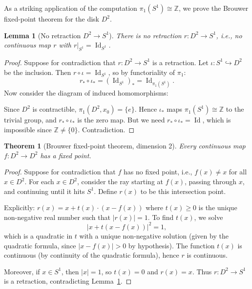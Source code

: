 \documentclass[12pt,a4paper,openany]{book}
\theoremstyle{definition}
\theoremstyle{plain}
\newtheorem{theorem}[definition]{Theorem}
\newtheorem{lemma}[definition]{Lemma}
\theoremstyle{remark}
\newcommand{\Z}{\mathbb{Z}}
\DeclareMathOperator{\Id}{Id}
\newcommand{\abs}[1]{\left|#1\right|}
\begin{document}
As a striking application of the computation $\pi_1(S^1) \cong \Z$, we prove
the Brouwer fixed-point theorem for the disk $D^2$.

\begin{lemma}[No retraction $D^2 \to S^1$]\label{lem:no-retraction}
There is no retraction $r \colon D^2 \to S^1$, i.e., no continuous map $r$
with $r|_{S^1} = \Id_{S^1}$.
\end{lemma}

\begin{proof}
Suppose for contradiction that $r \colon D^2 \to S^1$ is a retraction. Let
$\iota \colon S^1 \hookrightarrow D^2$ be the inclusion. Then $r \circ \iota =
\Id_{S^1}$, so by functoriality of $\pi_1$:
\[
  r_* \circ \iota_* = (\Id_{S^1})_* = \Id_{\pi_1(S^1)}.
\]
Now consider the diagram of induced homomorphisms:
\begin{center}
\end{center}
Since $D^2$ is contractible, $\pi_1(D^2, x_0) = \{e\}$. Hence $\iota_*$ maps
$\pi_1(S^1) \cong \Z$ to the trivial group, and $r_* \circ \iota_*$ is the
zero map. But we need $r_* \circ \iota_* = \Id$, which is impossible since
$\Z \ne \{0\}$. Contradiction.
\end{proof}

\begin{theorem}[Brouwer fixed-point theorem, dimension 2]\label{thm:brouwer-2d}
Every continuous map $f \colon D^2 \to D^2$ has a fixed point.
\end{theorem}

\begin{proof}
Suppose for contradiction that $f$ has no fixed point, i.e., $f(x) \ne x$ for
all $x \in D^2$. For each $x \in D^2$, consider the ray starting at $f(x)$,
passing through $x$, and continuing until it hits $S^1$. Define $r(x)$ to be
this intersection point.

Explicitly: $r(x) = x + t(x) \cdot (x - f(x))$ where $t(x) \ge 0$ is the
unique non-negative real number such that $\abs{r(x)} = 1$. To find $t(x)$, we
solve
\[
  \abs{x + t(x - f(x))}^2 = 1,
\]
which is a quadratic in $t$ with a unique non-negative solution (given by the
quadratic formula, since $\abs{x - f(x)} > 0$ by hypothesis). The function $t(x)$
is continuous (by continuity of the quadratic formula), hence $r$ is continuous.

Moreover, if $x \in S^1$, then $\abs{x} = 1$, so $t(x) = 0$ and $r(x) = x$.
Thus $r \colon D^2 \to S^1$ is a retraction, contradicting
Lemma~\ref{lem:no-retraction}.
\end{proof}
\end{document}
